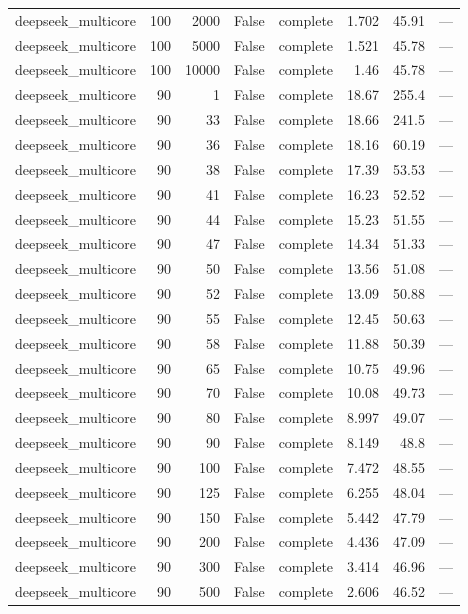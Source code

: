 \begin{tabular}{lrrrlrrl}
deepseek\_multicore & 100 & 2000 & False & complete & 1.702 & 45.91 & — \\
deepseek\_multicore & 100 & 5000 & False & complete & 1.521 & 45.78 & — \\
deepseek\_multicore & 100 & 10000 & False & complete & 1.46 & 45.78 & — \\
deepseek\_multicore & 90 & 1 & False & complete & 18.67 & 255.4 & — \\
deepseek\_multicore & 90 & 33 & False & complete & 18.66 & 241.5 & — \\
deepseek\_multicore & 90 & 36 & False & complete & 18.16 & 60.19 & — \\
deepseek\_multicore & 90 & 38 & False & complete & 17.39 & 53.53 & — \\
deepseek\_multicore & 90 & 41 & False & complete & 16.23 & 52.52 & — \\
deepseek\_multicore & 90 & 44 & False & complete & 15.23 & 51.55 & — \\
deepseek\_multicore & 90 & 47 & False & complete & 14.34 & 51.33 & — \\
deepseek\_multicore & 90 & 50 & False & complete & 13.56 & 51.08 & — \\
deepseek\_multicore & 90 & 52 & False & complete & 13.09 & 50.88 & — \\
deepseek\_multicore & 90 & 55 & False & complete & 12.45 & 50.63 & — \\
deepseek\_multicore & 90 & 58 & False & complete & 11.88 & 50.39 & — \\
deepseek\_multicore & 90 & 65 & False & complete & 10.75 & 49.96 & — \\
deepseek\_multicore & 90 & 70 & False & complete & 10.08 & 49.73 & — \\
deepseek\_multicore & 90 & 80 & False & complete & 8.997 & 49.07 & — \\
deepseek\_multicore & 90 & 90 & False & complete & 8.149 & 48.8 & — \\
deepseek\_multicore & 90 & 100 & False & complete & 7.472 & 48.55 & — \\
deepseek\_multicore & 90 & 125 & False & complete & 6.255 & 48.04 & — \\
deepseek\_multicore & 90 & 150 & False & complete & 5.442 & 47.79 & — \\
deepseek\_multicore & 90 & 200 & False & complete & 4.436 & 47.09 & — \\
deepseek\_multicore & 90 & 300 & False & complete & 3.414 & 46.96 & — \\
deepseek\_multicore & 90 & 500 & False & complete & 2.606 & 46.52 & — \\

\end{tabular}

